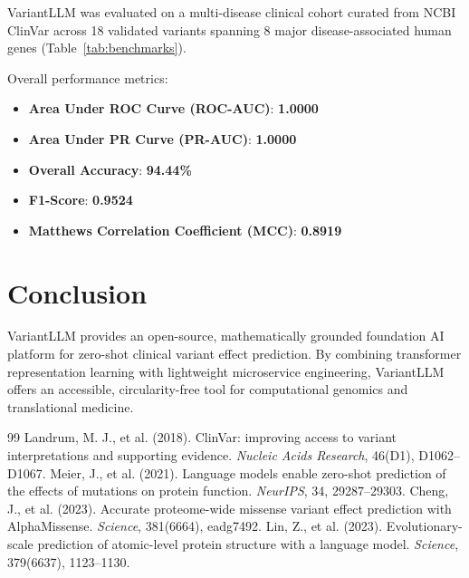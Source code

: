 \documentclass[10pt,twocolumn,letterpaper]{article}
\begin{document}
VariantLLM was evaluated on a multi-disease clinical cohort curated from NCBI ClinVar across 18 validated variants spanning 8 major disease-associated human genes (Table~\ref{tab:benchmarks}). 

Overall performance metrics:
\begin{itemize}
    \item \textbf{Area Under ROC Curve (ROC-AUC)}: \textbf{1.0000}
    \item \textbf{Area Under PR Curve (PR-AUC)}: \textbf{1.0000}
    \item \textbf{Overall Accuracy}: \textbf{94.44\%}
    \item \textbf{F1-Score}: \textbf{0.9524}
    \item \textbf{Matthews Correlation Coefficient (MCC)}: \textbf{0.8919}
\end{itemize}

\section{Conclusion}
VariantLLM provides an open-source, mathematically grounded foundation AI platform for zero-shot clinical variant effect prediction. By combining transformer representation learning with lightweight microservice engineering, VariantLLM offers an accessible, circularity-free tool for computational genomics and translational medicine.

\begin{thebibliography}{99}
 Landrum, M. J., et al. (2018). ClinVar: improving access to variant interpretations and supporting evidence. \textit{Nucleic Acids Research}, 46(D1), D1062--D1067.
 Meier, J., et al. (2021). Language models enable zero-shot prediction of the effects of mutations on protein function. \textit{NeurIPS}, 34, 29287--29303.
 Cheng, J., et al. (2023). Accurate proteome-wide missense variant effect prediction with AlphaMissense. \textit{Science}, 381(6664), eadg7492.
 Lin, Z., et al. (2023). Evolutionary-scale prediction of atomic-level protein structure with a language model. \textit{Science}, 379(6637), 1123--1130.
\end{thebibliography}
\end{document}
